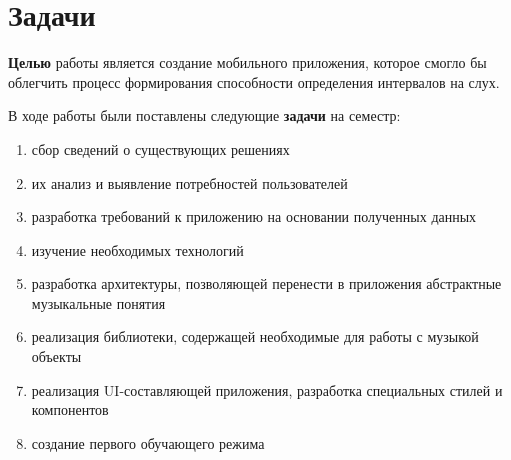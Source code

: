 \chapter*{Задачи}

\textbf{Целью} работы является создание мобильного приложения, которое смогло бы облегчить процесс формирования способности определения интервалов на слух. \medskip\par
В ходе работы были поставлены следующие \textbf{задачи} на семестр:
\begin{enumerate}
\item сбор сведений о существующих решениях
\item их анализ и выявление потребностей пользователей
\item разработка требований к приложению на основании полученных данных
\item изучение необходимых технологий
\item разработка архитектуры, позволяющей перенести в приложения абстрактные музыкальные понятия
\item реализация библиотеки, содержащей необходимые для работы с музыкой объекты
\item реализация UI-составляющей приложения, разработка специальных стилей и компонентов
\item создание первого обучающего режима
\end{enumerate}\par